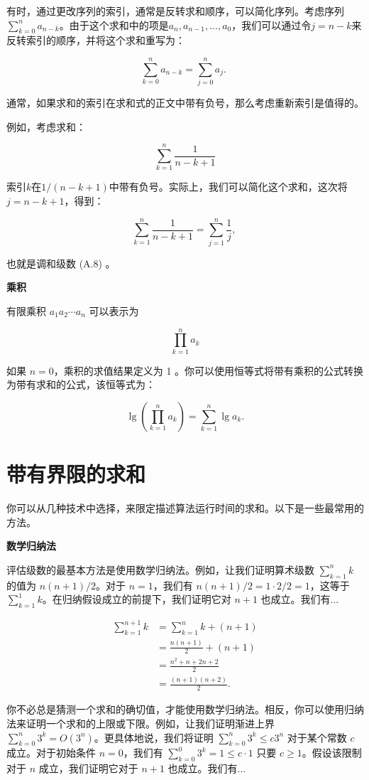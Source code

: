 \documentclass[lang=cn,newtx,10pt,scheme=chinese]{elegantbook}
\begin{document}
有时，通过更改序列的索引，通常是反转求和顺序，可以简化序列。考虑序列$\sum_{k=0}^n a_{n-k}$。由于这个求和中的项是$a_n, a_{n-1}, \ldots, a_0$，我们可以通过令$j=n-k$来反转索引的顺序，并将这个求和重写为：

$$
\sum_{k=0}^n a_{n-k}=\sum_{j=0}^n a_j \text {. }
$$

通常，如果求和的索引在求和式的正文中带有负号，那么考虑重新索引是值得的。

例如，考虑求和：

$$
\sum_{k=1}^n \frac{1}{n-k+1}
$$

索引$k$在$1/(n-k+1)$中带有负号。实际上，我们可以简化这个求和，这次将$j=n-k+1$，得到：

$$
\sum_{k=1}^n \frac{1}{n-k+1}=\sum_{j=1}^n \frac{1}{j} \text {, }
$$

也就是调和级数 (A.8) 。

\textbf{乘积}

有限乘积 $a_1 a_2 \cdots a_n$ 可以表示为

$$
\prod_{k=1}^n a_k
$$

如果 $n=0$，乘积的求值结果定义为 1 。你可以使用恒等式将带有乘积的公式转换为带有求和的公式，该恒等式为：

$$
\lg \left(\prod_{k=1}^n a_k\right)=\sum_{k=1}^n \lg a_k .
$$

\section{带有界限的求和}\label{section:A.2}

你可以从几种技术中选择，来限定描述算法运行时间的求和。以下是一些最常用的方法。

\textbf{数学归纳法}

评估级数的最基本方法是使用数学归纳法。例如，让我们证明算术级数 $\sum_{k=1}^n k$ 的值为 $n(n+1) / 2$。对于 $n=1$，我们有 $n(n+1) / 2=1 \cdot 2 / 2=1$，这等于 $\sum_{k=1}^1 k$。在归纳假设成立的前提下，我们证明它对 $n+1$ 也成立。我们有...

$$
\begin{aligned}
\sum_{k=1}^{n+1} k & =\sum_{k=1}^n k+(n+1) \\
& =\frac{n(n+1)}{2}+(n+1) \\
& =\frac{n^2+n+2 n+2}{2} \\
& =\frac{(n+1)(n+2)}{2} .
\end{aligned}
$$

你不必总是猜测一个求和的确切值，才能使用数学归纳法。相反，你可以使用归纳法来证明一个求和的上限或下限。例如，让我们证明渐进上界 $\sum_{k=0}^n 3^k=O\left(3^n\right)$。更具体地说，我们将证明 $\sum_{k=0}^n 3^k \leq c 3^n$ 对于某个常数 $c$ 成立。对于初始条件 $n=0$，我们有 $\sum_{k=0}^0 3^k=1 \leq c \cdot 1$ 只要 $c \geq 1$。假设该限制对于 $n$ 成立，我们证明它对于 $n+1$ 也成立。我们有...
\end{document}
